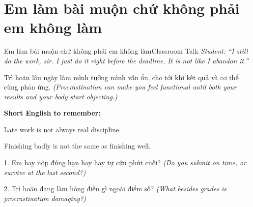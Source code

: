 \section{Em làm bài muộn chứ không phải em không làm}
\begin{truyen}{Em làm bài muộn chứ không phải em không làm}{Classroom Talk}
\textit{Student: ``I still do the work, sir. I just do it right before the deadline. It is not like I abandon it.''}\\[4pt]



\end{truyen}

\begin{baihoc}
Trì hoãn lâu ngày làm mình tưởng mình vẫn ổn, cho tới khi kết quả và cơ thể cùng phản ứng.
\textit{(Procrastination can make you feel functional until both your results and your body start objecting.)}
\end{baihoc}

\begin{ghinhoanh}
\textbf{Short English to remember:}

Late work is not always real discipline.

Finishing badly is not the same as finishing well.
\end{ghinhoanh}

\begin{tuhocnhanh}
1. Em hay nộp đúng hạn hay hay tự cứu phút cuối? \textit{(Do you submit on time, or survive at the last second?)}

2. Trì hoãn đang làm hỏng điều gì ngoài điểm số? \textit{(What besides grades is procrastination damaging?)}
\end{tuhocnhanh}
\ngancach

